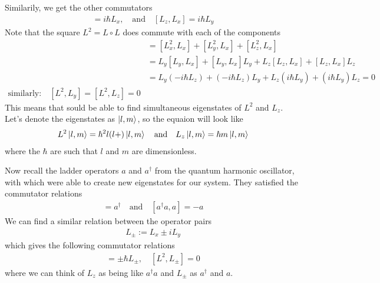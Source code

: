 Similarily, we get the other commutators
\begin{align*}
	[L_y,L_z] = i \hbar L_x, \quad \text{and} \quad [L_z,L_x] = i \hbar L_y
\end{align*}
Note that the square $L^2 = L \circ L$ does commute with each of the components
\begin{align*}
    [L^2,L_x] 
  &= 
    [L_x^2,L_x] + [L_y^2, L_x] + [L_z^2,L_x]\\
  &= 
    L_y[L_y,L_x] + [L_y,L_x]L_y + L_z[L_z,L_x] + [L_z,L_x]L_z\\
  &= L_y(-i \hbar L_z) + (-i \hbar L_z)L_y + L_z(i \hbar L_y) + (i \hbar L_y)L_z = 0\\
  \text{similarly:}\quad [L^2,L_y] = [L^2,L_z] = 0
\end{align*}
This means that sould be able to find simultaneous eigenstates of $L^2$ and $L_z$.
Let's denote the eigenstates as $\ket{l,m}$, so the equaion will look like
\begin{align*}
  L^2 \ket{l,m} = \hbar^{2}l(l+) \ket{l,m} \quad \text{and} \quad L_z \ket{l,m} = \hbar m \ket{l,m}
\end{align*}
where the $\hbar$ are such that $l$ and $m$ are dimensionless.

Now recall the ladder operators $a$ and $a^{\dagger}$ from the quantum harmonic oscillator, with which were able to create new eigenstates for our system.
They satisfied the commutator relations
\begin{align*}
  [a^{\dagger}a,a^{\dagger}] = a^{\dagger} \quad \text{and} \quad [a^{\dagger}a,a] = -a
\end{align*}
We can find a similar relation between the operator pairs
\begin{align*}
  L_{\pm} := L_x \pm iL_y
\end{align*}
which gives the following commutator relations
\begin{align*}
  [L_z,L_{\pm}] =\pm \hbar L_{\pm}, \quad [L^2, L_{\pm}] = 0
\end{align*}
where we can think of $L_z$ as being like $a^{\dagger}a$ and $L_{\pm}$ as $a^{\dagger}$ and $a$.

